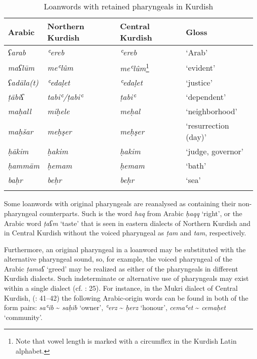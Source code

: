 \documentclass[output=paper]{langsci/langscibook}
\begin{document}
\begin{table}
\begin{tabular}{llll}
\lsptoprule
{Arabic} & {Northern Kurdish} & {Central Kurdish} & {Gloss}\\\midrule
\textit{ʕarab}     & \textit{ʿereb}        & \textit{ʿereb}                    & ‘Arab’\\
\textit{maʕlūm}    & \textit{meʿlûm}       & \textit{meʿlûm}\footnote{Note that vowel length is marked with a circumflex in the Kurdish Latin alphabet.}    & ‘evident’\\
\textit{ʕadāla(t)} & \textit{ʿedaḷet}      & \textit{ʿedaḷet}                  & ‘justice’\\
\textit{ṭābiʕ}     & \textit{tabiʿ/ṭabiʿ}  & \textit{ṭabiʿ}                    & ‘dependent’\\
\textit{maḥall}    & \textit{miḥele}       & \textit{meḥal}                    & ‘neighborhood’\\
\textit{maḥšar}    & \textit{meḥşer}       & \textit{meḥşer}                   & ‘resurrection (day)’\\
\textit{ḥākim}     & \textit{ḥakim}        & \textit{ḥakim}                    & ‘judge, governor’\\
\textit{ḥammām}    & \textit{ḥemam}        & \textit{ḥemam}                    & ‘bath’\\
\textit{baḥr}      & \textit{beḥr}         & \textit{beḥr}                     & ‘sea’\\
\lspbottomrule
\end{tabular}
\caption{\label{bkm:Ref14691447}Loanwords with retained pharyngeals in Kurdish}
\label{tab:opengin:3}
\end{table}

Some loanwords with original pharyngeals are reanalysed as containing their non-pharyngeal counterparts. Such is the word \textit{haq} from Arabic \textit{ḥaqq} ‘right’, or the Arabic word \textit{ṭaʕm} ‘taste’ that is seen in eastern dialects of Northern Kurdish and in Central Kurdish without the voiced pharyngeal as \textit{ṭam} and \textit{tam}, respectively. 

Furthermore, an original pharyngeal in a loanword may be substituted with the alternative pharyngeal sound, so, for example, the voiced pharyngeal of the Arabic \textit{ṭamaʕ} ‘greed’ may be realized as either of the pharyngeals in different Kurdish dialects. Such indeterminate or alternative use of pharyngeals may exist within a single dialect (cf. \citealt{Kahn1976}: 25). For instance, in the Mukri dialect of Central Kurdish, (\citealt{Öpengin2016}: 41–42) the following Arabic-origin words can be found in both of the form pairs: \textit{saʿib} {\textasciitilde} \textit{saḥib} ‘owner’, \textit{ʿerz} {\textasciitilde} \textit{ḥerz} ‘honour’, \textit{cemaʿet} {\textasciitilde} \textit{cemaḥet} ‘community’. 
\end{document}
